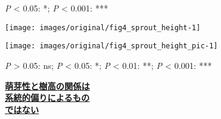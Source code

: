 \documentclass[a0, 25, plainboxedsections]{sciposter} %
\begin{document}
\begin{multicols}{2}
\begin{mdframed}[style=subsection.frame,frametitle=\textbf{\LARGE{More highly sprouters are more avoid self-shading}}]
\begin{figure}
\begin{minipage}{0.75\hsize}
   \flushleft\vspace{-1em}\hspace*{0.6em}
    {\tiny \textit{P} < 0.05: *; \textit{P} < 0.001: ***}
 \end{minipage}
\end{figure}

\end{mdframed}

\columnbreak
\begin{mdframed}[style=subsection.frame,frametitle=\textbf{\LARGE{Sprout availability increases with decreasing height}}] %
\vspace{-1.0em}
\begin{figure}
	\centering
		\texttt{[image: images/original/fig4\_sprout\_height-1]}
	
	\flushleft
\end{figure}

\vspace{-1.5em}
\begin{figure}
 \begin{minipage}{0.55\hsize}
  \centering
   \texttt{[image: images/original/fig4\_sprout\_height\_pic-1]}
   
   {\tiny \textit{P} > 0.05: ns; \textit{P} < 0.05: *; \textit{P} < 0.01: **; \textit{P} < 0.001: ***}
 \end{minipage}
 \begin{minipage}{0.45\hsize}
{\large \faHandLeft \textbf{\underline{萌芽性と樹高の関係は}}\\ \textbf{\underline{系統的偏りによるもの}}\\\textbf{\underline{ではない}}}
 \end{minipage}
\end{figure}

\end{mdframed}

\end{multicols}

\end{document}
